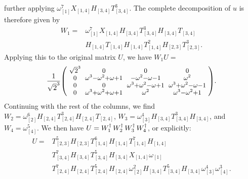 \begin{example}
  further applying $\omega_{[1]}^7 X_{[1,4]} H_{[3,4]} T_{[3,4]}^3$. The complete decomposition of
  $u$ is therefore given by
	\[
    \begin{split}
      W_1={}&\omega_{[1]}^7  X_{[1,4]} H_{[3,4]} T_{[3,4]}^3H_{[3,4]} T_{[3,4]}\\&
      H_{[1,4]} T_{[1,4]} H_{[1,4]} T_{[1,4]}^2 H_{[2,3]} T_{[2,3]}^3.
    \end{split}
    \]
	Applying this to the original matrix $U$, we have $W_1U=$
	\[
    \small \frac{\small 1}{\small\sqrt{2}^3}\footnotesize\zmatrix{cccc}{
    \sqrt{2}^3             & 0      & 0                           & 0\\
    0 & \omega^3{-}\omega^2{+}\omega{+}1  & {-}\omega^2{-}\omega{-}1          & \omega^2\\
    0 & 0                           & \omega^3{+}\omega^2{-}\omega{+}1  & \omega^3{+}\omega^2{-}\omega{-}1\\
    0 & \omega^3{+}\omega^2{+}\omega{+}1 & \omega^2                    & \omega^3{-}\omega^2{+}1
    }.
  \]
  Continuing with the rest of the columns, we find $W_2 = \omega_{[2]}^6 H_{[2,4]} T_{[2,4]}^3
  H_{[2,4]} T_{[2,4]}$, $W_3 = \omega_{[3]}^4 H_{[3,4]} T_{[3,4]}^3 H_{[3,4]}$, and
  $W_4=\omega_{[4]}^5$. We then have $U = W_1^{\dagger}\, W_2^{\dagger}\, W_3^{\dagger}\, W_4^{\dagger}$, or explicitly:
  \[
    \begin{split} 
      U ={}&  T_{[2,3]}^5 H_{[2,3]} T_{[1,4]}^6 H_{[1,4]} T_{[1,4]}^7 H_{[1,4]}\\&
    					T_{[3,4]}^7 H_{[3,4]} 
    					T_{[3,4]}^5 H_{[3,4]}
                                            X_{[1,4]} \omega_{[1]}\\&
      T_{[2,4]}^7 H_{[2,4]} T_{[2,4]}^5 H_{[2,4]} \omega_{[2]}^2
      H_{[3,4]} T_{[3,4]}^5 H_{[3,4]} \omega_{[3]}^4
      \omega_{[4]}^3.
    \end{split}
  \]
\end{example}



